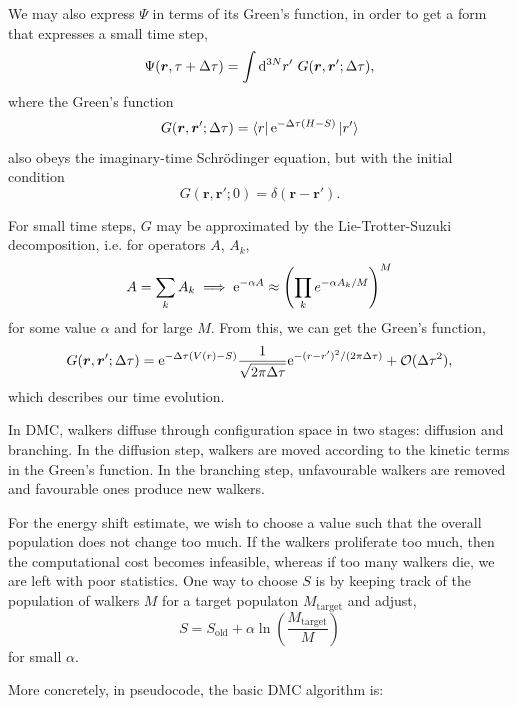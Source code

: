 We may also express $\Psi$ in terms of its Green's function, in order to get a form that expresses a small time step,
\begin{equation}
\Psi(\bm r, \tau+\Delta\tau) = \int\mathrm{d}^{3N}r' \ G(\bm r, \bm r'; \Delta\tau),
\end{equation}
where the Green's function
\begin{equation}
G(\bm r, \bm r'; \Delta\tau) = \bra{r}\mathrm{e}^{-\Delta\tau(H-S)}\ket{r'}
\end{equation}
also obeys the imaginary-time Schr\"odinger equation, but with the initial condition
\begin{equation}
    G(\bm r, \bm r'; 0) = \delta(\bm r-\bm r').
\end{equation}

For small time steps, $G$ may be approximated by the Lie-Trotter-Suzuki decomposition,\supercite{lieTheorie1970,trotterProduct1959,suzukiGeneralized1976} i.e. for operators $A$, $A_k$,
\begin{equation}
    A = \sum_kA_k \implies \mathrm{e}^{-\alpha A} \approx \left( \prod_k e^{-\alpha A_k/M} \right)^M
\end{equation}
for some value $\alpha$ and for large $M$. From this, we can get the Green's function,
\begin{equation}
    G(\bm r, \bm r'; \Delta\tau) = \mathrm{e}^{-\Delta\tau(V(r)-S)}\frac{1}{\sqrt{2\pi\Delta\tau}}\mathrm{e}^{-(r - r')^2/(2\pi\Delta\tau)}+\mathcal{O}(\Delta\tau^2),
\end{equation}
which describes our time evolution.

In \gls{DMC}, walkers diffuse through configuration space in two stages: diffusion and branching. In the diffusion step, walkers are moved according to the kinetic terms in the Green's function. In the branching step, unfavourable walkers are removed and favourable ones produce new walkers.

For the energy shift estimate, we wish to choose a value such that the overall population does not change too much. If the walkers proliferate too much, then the computational cost becomes infeasible, whereas if too many walkers die, we are left with poor statistics. One way to choose $S$ is by keeping track of the population of walkers $M$ for a target populaton $M_\mathrm{target}$ and adjust,
\begin{equation}
    S = S_\mathrm{old} + \alpha\ln\left(\frac{M_\mathrm{target}}{M}\right)
\end{equation}
for small $\alpha$.

More concretely, in pseudocode, the basic \gls{DMC} algorithm is:

